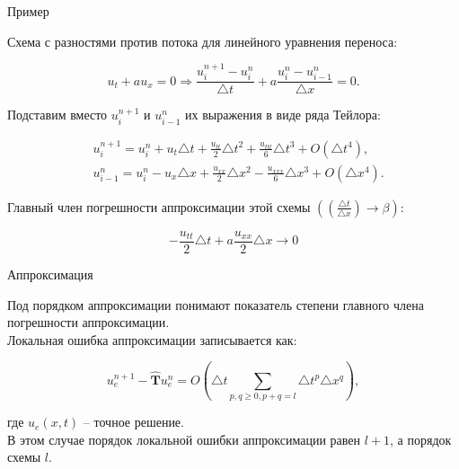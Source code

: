 \documentclass[10pt,xcolor=pst,aspectratio=169]{beamer}
\begin{document}
\begin{frame}{Пример}

    \transdissolve[duration=0.1]
    \justifying
    \large

    Схема с разностями против потока для линейного уравнения переноса:

    \[
        u_{t} + a u_{x} = 0 \Rightarrow \frac{u^{n + 1}_{i} - u^{n}_{i}}{\triangle t} + a \frac{u^{n}_{i} - u^{n}_{i - 1}}{\triangle x} = 0.
    \]    

    Подставим вместо $u^{n + 1}_{i}$ и $u^{n}_{i - 1}$ их выражения в виде ряда Тейлора:

    \[
        \begin{split}
            &u^{n + 1}_{i} = u^{n}_{i} + u_{t} \triangle t + \frac{u_{tt}}{2} \triangle t^{2} + \frac{u_{ttt}}{6} \triangle t^{3} + O(\triangle t^{4}),\\
            &u^{n}_{i - 1} = u^{n}_{i} - u_{x} \triangle x + \frac{u_{xx}}{2} \triangle x^{2} - \frac{u_{xxx}}{6} \triangle x^{3} + O(\triangle x^{4}).
        \end{split}
    \]

    Главный член погрешности аппроксимации этой схемы $\left( \left( \frac{\triangle t}{\triangle x} \right) \rightarrow \beta \right)$:

    \[
        -\frac{u_{tt}}{2} \triangle t + a \frac{u_{xx}}{2} \triangle x \rightarrow 0
    \]

\end{frame}

\begin{frame}{Аппроксимация}

    \transdissolve[duration=0.1]
    \justifying
    \large

    Под порядком аппроксимации понимают показатель степени главного члена погрешности аппроксимации. \\

    Локальная ошибка аппроксимации записывается как:

    \[
        u^{n + 1}_{e} - \hat{\textbf{T}} u^{n}_{e} = O \left( \triangle t \sum_{p , q \geq 0, p + q = l} \triangle t^{p} \triangle x^{q} \right),
    \]

    где $u_{e} (x, t)$ -- точное решение. \\

    В этом случае порядок локальной ошибки аппроксимации равен $l + 1$, а порядок схемы $l$.

\end{frame}
\end{document}
